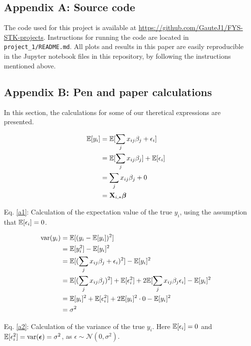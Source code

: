 \subsection{Appendix A: Source code} \label{appendixA}
The code used for this project is available at \url{https://github.com/GauteJ1/FYS-STK-projects}. Instructions for running the code are located in \texttt{ project\_1/README.md}. All plots and results in this paper are easily reproducible in the Jupyter notebook files in this repository, by following the instructions mentioned above.

\subsection{Appendix B: Pen and paper calculations}\label{appendixB}

In this section, the calculations for some of our theretical expressions are presented. 

\begin{align}\label{a1}
    \mathbb{E}[y_i] & = \mathbb{E}[\sum_j x_{ij}\beta_j + \epsilon_i] \nonumber \\
    & = \mathbb{E}[\sum_j x_{ij}\beta_j] + \mathbb{E}[\epsilon_i] \nonumber \\ 
    & = \sum_j x_{ij}\beta_j + 0 \nonumber \\
    & = \mathbf{X}_{i,*}\boldsymbol{\beta}
\end{align}

Eq. \ref{a1}: Calculation of the expectation value of the true $y_i$, using the assumption that $\mathbb{E}[\epsilon_i] = 0$. 



\begin{align}\label{a2}
    \text{var}(y_i) & = \mathbb{E}[(y_i -\mathbb{E}[y_i])^2] \nonumber \\
    & = \mathbb{E}[y_i^2] - \mathbb{E}[y_i]^2 \nonumber \\ 
    & = \mathbb{E}[(\sum_j x_{ij}\beta_j + \epsilon_i)^2] - \mathbb{E}[y_i]^2 \nonumber \\
    & = \mathbb{E}[(\sum_j x_{ij}\beta_j)^2] + \mathbb{E}[\epsilon_i^2] + 2\mathbb{E}[\sum_j x_{ij}\beta_j \epsilon_i ] - \mathbb{E}[y_i]^2 \nonumber \\
    & = \mathbb{E}[y_i]^2 + \mathbb{E}[\epsilon_i^2] + 2\mathbb{E}[y_i]^2\cdot 0 - \mathbb{E}[y_i]^2 \nonumber \\ 
    & = \sigma^2
\end{align}

Eq. \ref{a2}: Calculation of the variance of the true $y_i$. Here $\mathbb{E}[\epsilon_i] = 0$ and $\mathbb{E}[\epsilon_i^2] = \text{var}(\boldsymbol{\epsilon}) = \sigma^2$, as $\epsilon \sim  
\mathcal{N}(0,\sigma^2)$.

